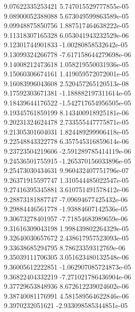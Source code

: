{9.07622335253421 5.747015529777855e-05 \\
9.08900052388088 5.673049599863589e-05 \\
9.09948875850756 1.887517464638222e-05 \\
9.11318307165328 6.053041943232529e-06 \\
9.12301744901833 -1.00280858532642e-05 \\
9.13099324266778 -7.617158644279698e-06 \\
9.14008212473618 1.058219550031936e-05 \\
9.15060306674161 1.419059572072001e-05 \\
9.16083996043608 2.520457265120513e-08 \\
9.17592303671381 -1.188882197311614e-05 \\
9.18439644176522 -1.542717654956505e-05 \\
9.19345761859199 8.143400918925181e-06 \\
9.20231324624478 2.733555447775871e-05 \\
9.21305301604031 1.824489299906418e-05 \\
9.22548843322778 6.357545316859614e-06 \\
9.23723504219606 -2.591289785414119e-06 \\
9.24536501755915 -1.265370156033896e-05 \\
9.25473030434631 9.960432407751796e-07 \\
9.26371915597747 1.310544485022547e-05 \\
9.27416395345881 3.610751491578412e-06 \\
9.28873181887747 -7.09694677425432e-06 \\
9.29884446561778 -1.93884607142536e-05 \\
9.30673278401957 -7.71854683989659e-06 \\
9.31616309043198 1.998439802264329e-05 \\
9.32640030657672 2.438617957523093e-05 \\
9.33638685294795 8.78623359312769e-06 \\
9.35039111706305 3.051623480132548e-06 \\
9.36005612222851 -1.062907085724873e-05 \\
9.36822404332219 -7.271021786436904e-06 \\
9.37729653848936 8.672612239024602e-06 \\
9.38740081176991 4.581589564622846e-06 \\
9.3970232051621 -2.933098585344851e-05 \\
}
